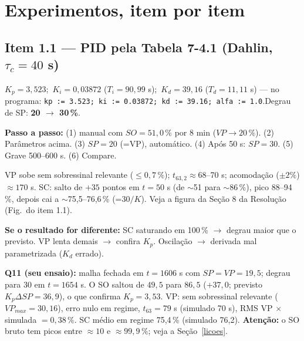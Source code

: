 \documentclass[11pt,a4paper]{article}
\begin{document}
\section{Experimentos, item por item}
\subsection{Item 1.1 --- PID pela Tabela 7-4.1 (Dahlin, $\tau_c=40$ s)}
\begin{parm}$K_p=3{,}523$;\ $K_i=0{,}03872$ ($T_i=90{,}99$ s);\ $K_d=39{,}16$ ($T_d=11{,}11$ s) --- no programa: \texttt{kp := 3.523; ki := 0.03872; kd := 39.16; alfa := 1.0}.\quad Degrau de SP: \textbf{20 $\to$ 30\,\%}.\end{parm}
\textbf{Passo a passo:} (1) manual com $SO=51{,}0\,\%$ por 8 min ($VP\to20\,\%$). (2) Parâmetros acima. (3) $SP=20$ (=VP), automático. (4) Após 50 s: $SP=30$. (5) Grave 500--600 s. (6) Compare.
\begin{esp}VP sobe sem sobressinal relevante ($\le0{,}7\,\%$); $t_{63,2}\approx68$--70 s; acomodação ($\pm2\%$) $\approx170$ s. SC: salto de $+35$ pontos em $t=50$ s (de $\sim$51 para $\sim$86\,\%), pico 88--94\,\%, depois cai a $\sim$75,5--76,6\,\% (=$30/K$). Veja a figura da Seção 8 da Resolução (Fig.\ do item 1.1).\end{esp}
\textbf{Se o resultado for diferente:} SC saturando em 100\,\% $\to$ degrau maior que o previsto. VP lenta demais $\to$ confira $K_p$. Oscilação $\to$ derivada mal parametrizada ($K_d$ errado).

\begin{real}\textbf{Q11 (seu ensaio):} malha fechada em $t=1606$ s com $SP=VP=19{,}5$; degrau para 30 em $t=1654$ s. O SO saltou de $49{,}5$ para $86{,}5$ ($+37{,}0$; previsto $K_p\Delta SP=36{,}9$), o que confirma $K_p=3{,}53$. VP: sem sobressinal relevante ($VP_{max}=30{,}16$), erro nulo em regime, $t_{63}=79$ s (simulado 70 s), RMS VP $\times$ simulada $=0{,}38\,\%$. SC médio em regime 75,4\,\% (simulado 76,2). \textbf{Atenção:} o SO bruto tem picos entre $\approx10$ e $\approx99{,}9\,\%$; veja a Seção~\ref{licoes}.\end{real}
\end{document}
